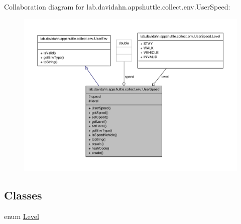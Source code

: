 \-Collaboration diagram for lab.\-davidahn.\-appshuttle.\-collect.\-env.\-User\-Speed\-:
\nopagebreak
\begin{figure}[H]
\begin{center}
\leavevmode
\includegraphics[width=350pt]{classlab_1_1davidahn_1_1appshuttle_1_1collect_1_1env_1_1_user_speed__coll__graph}
\end{center}
\end{figure}
\subsection*{\-Classes}
\begin{DoxyCompactItemize}
\item 
enum \hyperlink{enumlab_1_1davidahn_1_1appshuttle_1_1collect_1_1env_1_1_user_speed_1_1_level}{\-Level}
\end{DoxyCompactItemize}
